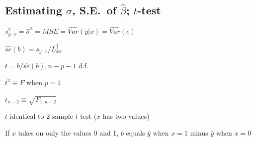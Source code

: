 \subsection{Estimating $\sigma$, S.E.\ of $\hat{\beta}$; $t$-test}
\bi
\item $s_{y\cdot x}^{2} = \hat{\sigma}^{2} = MSE = \widehat{Var}(y|x) =
  \widehat{Var}(e)$
\item $\widehat{se}(b) = s_{y\cdot x}/L_{xx}^\frac{1}{2}$
\item $t = b / \widehat{se}(b), n-p-1$ d.f.
\item $t^{2} \equiv F$ when $p=1$
\item $t_{n-2} \equiv \sqrt{F_{1, n-2}}$
\item $t$ identical to 2-sample $t$-test ($x$ has two values)
\item If $x$ takes on only the values 0 and 1, $b$ equals $\bar{y}$
  when $x=1$ minus   $\bar{y}$ when $x=0$
\ei

